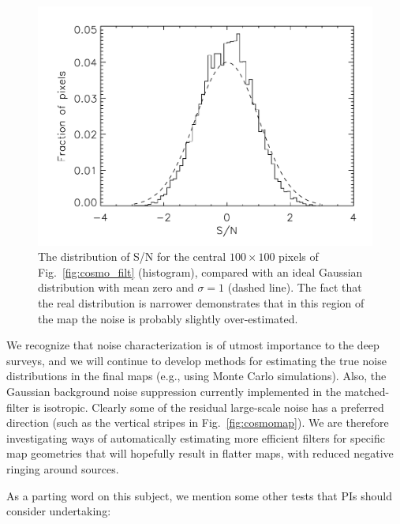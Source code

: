 \documentclass[twoside,11pt]{starlink}
\begin{document}
\begin{figure}
\begin{center}
\includegraphics[width=0.8\linewidth]{sc19_cosmo_snrcompare}
\caption{The distribution of S/N for the central $100 \times 100$
  pixels of Fig.~\ref{fig:cosmo_filt} (histogram), compared with an
  ideal Gaussian distribution with mean zero and $\sigma=1$ (dashed
  line). The fact that the real distribution is narrower demonstrates
  that in this region of the map the noise is probably slightly
  over-estimated.}
\label{fig:cosmo_snrcompare}
\end{center}
\end{figure}

We recognize that noise characterization is of utmost importance to
the deep surveys, and we will continue to develop methods for
estimating the true noise distributions in the final maps (e.g., using
Monte Carlo simulations). Also, the Gaussian background noise
suppression currently implemented in the matched-filter is
isotropic. Clearly some of the residual large-scale noise has a
preferred direction (such as the vertical stripes in
Fig.~\ref{fig:cosmomap}). We are therefore investigating ways of
automatically estimating more efficient filters for specific map
geometries that will hopefully result in flatter maps, with reduced
negative ringing around sources.

As a parting word on this subject, we mention some other tests that
PIs should consider undertaking:
\end{document}
